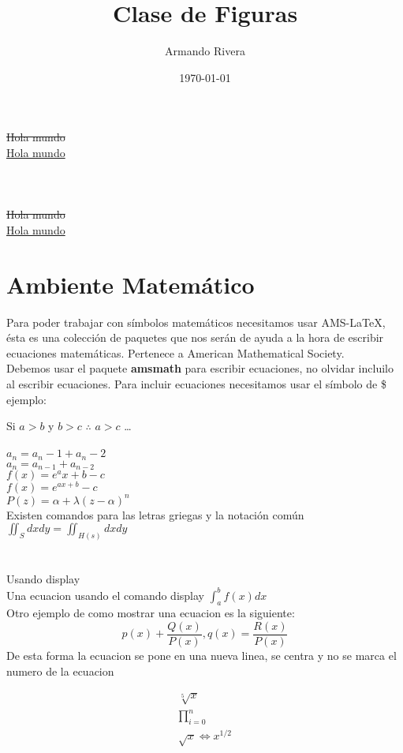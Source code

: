 \documentclass{report}
\title{Clase de Figuras}
\author{Armando Rivera}
\date{\today}
\begin{document}
	\maketitle
	\st{Hola mundo}\\
	\uline{Hola mundo}\\
	\\
	\\
	\\
	\st{Hola mundo}\\
	\ul{Hola mundo}
	

	\lipsum[1]
	
	
	\chapter{Ambiente Matemático}
	Para poder trabajar con símbolos matemáticos necesitamos usar AMS-LaTeX, ésta es una colección de paquetes que nos serán de ayuda a la hora de escribir ecuaciones matemáticas. Pertenece a American Mathematical Society.\\ Debemos usar el paquete \textbf{amsmath} para escribir ecuaciones, no olvidar incluilo al escribir ecuaciones. 
	Para incluir ecuaciones necesitamos usar el símbolo de \$ ejemplo: \par
	Si $a > b$ y $b>c$ $\therefore$ $a>c$ \ldots\\\\
	$a_n=a_n-1+a_n-2$\\	%
	$a_n=a_{n-1}+a_{n-2}$\\	%
	
	$f(x)=e^ax+b-c$			\\%
	$f(x)=e^{ax+b}-c$		\\	%
	
	$P(z)=\alpha + \lambda(z-\alpha)^n$\\
	Existen comandos para las letras griegas y la notación común\\
	$\iint_Sdxdy=\iint_{H(s)}dxdy$\\
	\\\\Usando display\\
	Una ecuacion usando el comando display $\displaystyle{\int_a^bf(x)dx}$
\\Otro ejemplo de como mostrar una ecuacion es la siguiente:
\[
p(x)+\frac{Q(x)}{P(x)}, q(x)=\frac{R(x)}{P(x)}
\]	De esta forma la ecuacion se pone en una nueva linea, se centra y no se marca el numero de la ecuacion

\begin{gather}
	\sqrt[5]{x}\\
	\prod_{i=0}^{n}\\
	\sqrt{x}\Leftrightarrow x^{1/2}
\end{gather}
\end{document}
